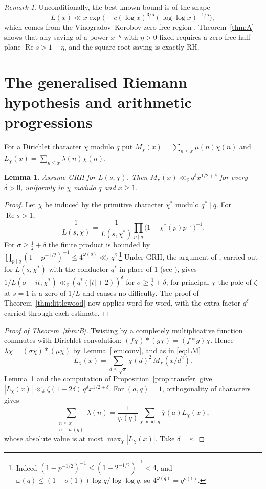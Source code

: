 \documentclass[11pt]{amsart}
\numberwithin{equation}{section}
\theoremstyle{plain}
\newtheorem{lem}[thm]{Lemma}
\theoremstyle{definition}
\theoremstyle{remark}
\newtheorem{rem}[thm]{Remark}
\renewcommand{\Re}{\operatorname{Re}}
\begin{document}
\begin{rem}
Unconditionally, the best known bound is of the shape
\[
L(x)\ll x\exp\big(-c(\log x)^{3/5}(\log\log x)^{-1/5}\big),
\]
which comes from the Vinogradov--Korobov zero-free region \cite[Chapter~6]{MV07}. Theorem~\ref{thm:A} shows that any saving of a power $x^{-\eta}$ with $\eta>0$ fixed requires a zero-free half-plane $\Re s>1-\eta$, and the square-root saving is exactly RH.
\end{rem}

\section{The generalised Riemann hypothesis and arithmetic progressions}\label{sec:grh}

For a Dirichlet character $\chi$ modulo $q$ put $M_\chi(x)=\sum_{n\le x}\mu(n)\chi(n)$ and $L_\chi(x)=\sum_{n\le x}\lambda(n)\chi(n)$.

\begin{lem}\label{lem:grhmobius}
Assume GRH for $L(s,\chi)$. Then $M_\chi(x)\ll_\delta q^{\delta}x^{1/2+\delta}$ for every $\delta>0$, uniformly in $\chi$ modulo $q$ and $x\ge1$.
\end{lem}

\begin{proof}
Let $\chi$ be induced by the primitive character $\chi^*$ modulo $q^*\mid q$. For $\Re s>1$,
\[
\frac{1}{L(s,\chi)}=\frac{1}{L(s,\chi^*)}\prod_{p\mid q}\big(1-\chi^*(p)p^{-s}\big)^{-1}.
\]
For $\sigma\ge\frac12+\delta$ the finite product is bounded by $\prod_{p\mid q}(1-p^{-1/2})^{-1}\le 4^{\omega(q)}\ll_\delta q^{\delta}$.\footnote{Indeed $(1-p^{-1/2})^{-1}\le(1-2^{-1/2})^{-1}<4$, and $\omega(q)\le(1+o(1))\log q/\log\log q$, so $4^{\omega(q)}=q^{o(1)}$.} Under GRH, the argument of \cite[\S14.2]{Tit86}, carried out for $L(s,\chi^*)$ with the conductor $q^*$ in place of $1$ (see \cite[Chapter~13]{MV07}), gives $1/L(\sigma+it,\chi^*)\ll_\delta (q^*(|t|+2))^{\delta}$ for $\sigma\ge\frac12+\delta$; for principal $\chi$ the pole of $\zeta$ at $s=1$ is a zero of $1/L$ and causes no difficulty. The proof of Theorem~\ref{thm:littlewood} now applies word for word, with the extra factor $q^\delta$ carried through each estimate.
\end{proof}

\begin{proof}[Proof of Theorem~\ref{thm:B}]
Twisting by a completely multiplicative function commutes with Dirichlet convolution: $(f\chi)*(g\chi)=(f*g)\chi$. Hence $\lambda\chi=(\sigma\chi)*(\mu\chi)$ by Lemma~\ref{lem:conv}, and as in \eqref{eq:LM}
\[
L_\chi(x)=\sum_{d\le\sqrt x}\chi(d)^2\,M_\chi(x/d^2).
\]
Lemma~\ref{lem:grhmobius} and the computation of Proposition~\ref{prop:transfer} give $|L_\chi(x)|\ll_\delta \zeta(1+2\delta)\,q^\delta x^{1/2+\delta}$. For $(a,q)=1$, orthogonality of characters gives
\[
\sum_{\substack{n\le x\\ n\equiv a\ (q)}}\lambda(n)=\frac{1}{\varphi(q)}\sum_{\chi\bmod q}\overline{\chi}(a)L_\chi(x),
\]
whose absolute value is at most $\max_\chi|L_\chi(x)|$. Take $\delta=\varepsilon$.
\end{proof}
\end{document}
